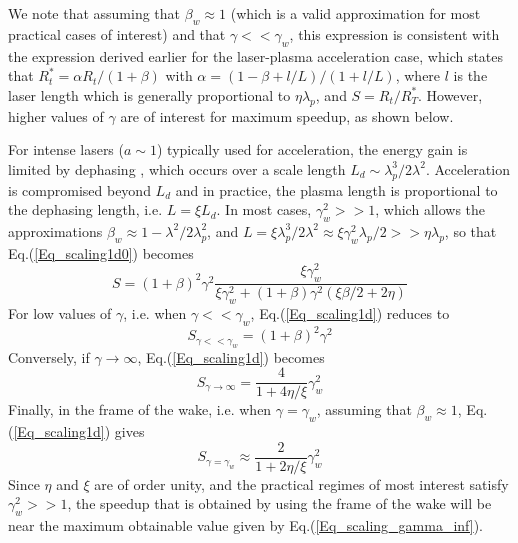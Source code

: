 \documentclass[]{report}
\begin{document}
We note that assuming that $\beta_w\approx1$ (which is a valid approximation for most practical cases of interest) and that $\gamma<<\gamma_w$, this expression is consistent with the expression derived earlier \cite{VayPRL07} for the laser-plasma acceleration case, which states that $R_t^*=\alpha R_t/\left(1+\beta\right)$ with $\alpha=\left(1-\beta+l/L\right)/\left(1+l/L\right)$, where $l$ is the laser length which is generally proportional to $\eta \lambda_p$, and $S=R_t/R_T^*$. However, higher values of $\gamma$ are of interest for maximum speedup, as shown below.

For intense lasers ($a\sim 1$) typically used for acceleration, the energy gain is limited by dephasing \cite{SchroederPRL2011}, which occurs over a scale length $L_d \sim \lambda_p^3/2\lambda^2$.  
Acceleration is compromised beyond $L_d$ and in practice, the plasma length is proportional to the dephasing length, i.e. $L= \xi L_d$. In most cases, $\gamma_w^2>>1$, which allows the approximations $\beta_w\approx1-\lambda^2/2\lambda_p^2$, and $L=\xi \lambda_p^3/2\lambda^2\approx \xi \gamma_w^2 \lambda_p/2>>\eta \lambda_p$, so that Eq.(\ref{Eq_scaling1d0}) becomes
%
\begin{equation}
S=\left(1+\beta\right)^2\gamma^2\frac{\xi\gamma_w^2}{\xi\gamma_w^2+\left(1+\beta\right)\gamma^2\left(\xi\beta/2+2\eta\right)}
\label{Eq_scaling1d}
\end{equation}
%
For low values of $\gamma$, i.e. when $\gamma<<\gamma_w$, Eq.(\ref{Eq_scaling1d}) reduces to
%
\begin{equation}
S_{\gamma<<\gamma_w}=\left(1+\beta\right)^2\gamma^2
\label{Eq_scaling1d_simpl2}
\end{equation}
%
Conversely, if $\gamma\rightarrow\infty$, Eq.(\ref{Eq_scaling1d}) becomes
%
\begin{equation}
S_{\gamma\rightarrow\infty}=\frac{4}{1+4\eta/\xi}\gamma_w^2
\label{Eq_scaling_gamma_inf}
\end{equation}
%
Finally, in the frame of the wake, i.e. when $\gamma=\gamma_w$, assuming that $\beta_w\approx1$, Eq.(\ref{Eq_scaling1d}) gives
%
\begin{equation}
S_{\gamma=\gamma_w}\approx\frac{2}{1+2\eta/\xi}\gamma_w^2
\label{Eq_scaling_gamma_wake}
\end{equation}
Since $\eta$ and $\xi$ are of order unity, and the practical regimes of most interest satisfy $\gamma_w^2>>1$, the speedup that is obtained by using the frame of the wake will be near the maximum obtainable value given by Eq.(\ref{Eq_scaling_gamma_inf}).
\end{document}
